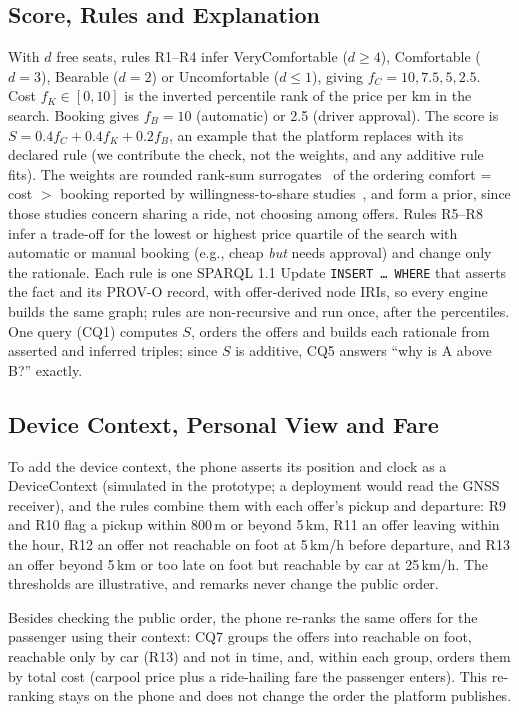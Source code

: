 \documentclass{svproc}
\begin{document}
\subsection{Score, Rules and Explanation}\label{sec:rules}
With $d$ free seats, rules R1--R4 infer \textsf{VeryComfortable} ($d \ge 4$), \textsf{Comfortable} ($d = 3$), \textsf{Bearable} ($d = 2$) or \textsf{Uncomfortable} ($d \le 1$), giving $f_C = 10, 7.5, 5, 2.5$. Cost $f_K \in [0,10]$ is the inverted percentile rank of the price per km in the search. Booking gives $f_B = 10$ (automatic) or 2.5 (driver approval). The score is $S = 0.4 f_C + 0.4 f_K + 0.2 f_B$, an example that the platform replaces with its declared rule (we contribute the check, not the weights, and any additive rule fits). The weights are rounded rank-sum surrogates~\cite{barron1996} of the ordering comfort = cost $>$ booking reported by willingness-to-share studies~\cite{si2023}, and form a prior, since those studies concern sharing a ride, not choosing among offers. Rules R5--R8 infer a trade-off for the lowest or highest price quartile of the search with automatic or manual booking (e.g., cheap \emph{but} needs approval) and change only the rationale. Each rule is one SPARQL 1.1 Update \texttt{INSERT\,\dots\,WHERE} that asserts the fact and its PROV-O record, with offer-derived node IRIs, so every engine builds the same graph; rules are non-recursive and run once, after the percentiles. One query (CQ1) computes $S$, orders the offers and builds each rationale from asserted and inferred triples; since $S$ is additive, CQ5 answers ``why is A above B?'' exactly.



\subsection{Device Context, Personal View and Fare}\label{sec:mobile}
To add the device context, the phone asserts its position and clock as a \textsf{DeviceContext} (simulated in the prototype; a deployment would read the GNSS receiver), and the rules combine them with each offer's pickup and departure: R9 and R10 flag a pickup within 800\,m or beyond 5\,km, R11 an offer leaving within the hour, R12 an offer not reachable on foot at 5\,km/h before departure, and R13 an offer beyond 5\,km or too late on foot but reachable by car at 25\,km/h. The thresholds are illustrative, and remarks never change the public order.

Besides checking the public order, the phone re-ranks the same offers for the passenger using their context: CQ7 groups the offers into reachable on foot, reachable only by car (R13) and not in time, and, within each group, orders them by total cost (carpool price plus a ride-hailing fare the passenger enters). This re-ranking stays on the phone and does not change the order the platform publishes.
\end{document}
